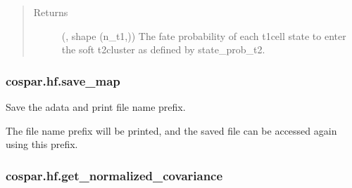 \documentclass[letterpaper,10pt,english]{sphinxmanual}
\begin{document}
\begin{fulllineitems}
\begin{quote}
\begin{description}
\begin{description}
\end{description}

\item[{Returns}] \leavevmode
{} (, shape (n\_t1,)) \textendash{} The fate probability of each t1\sphinxhyphen{}cell state to enter the soft
t2\sphinxhyphen{}cluster as defined by state\_prob\_t2.

\end{description}\end{quote}

\end{fulllineitems}



\subsubsection{cospar.hf.save\_map}
\label{\detokenize{cospar.hf.save_map:cospar-hf-save-map}}\label{\detokenize{cospar.hf.save_map::doc}}

\begin{fulllineitems}
\label{\detokenize{cospar.hf.save_map:cospar.hf.save_map}}
Save the adata and print file name prefix.

The file name prefix  will be printed, and
the saved file can be accessed again using this prefix.

\end{fulllineitems}



\subsubsection{cospar.hf.get\_normalized\_covariance}
\label{\detokenize{cospar.hf.get_normalized_covariance:cospar-hf-get-normalized-covariance}}\label{\detokenize{cospar.hf.get_normalized_covariance::doc}}
\end{document}
